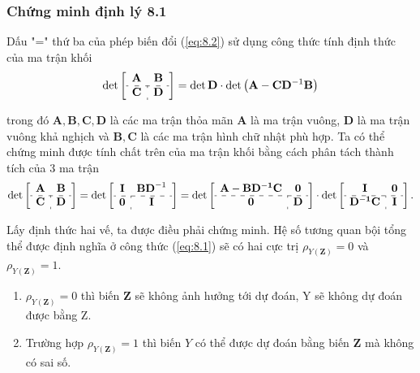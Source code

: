 
\begin{frame}
\frametitle{Chứng minh định lý 8.1}
Dấu "=" thứ ba của phép biến đổi (\ref{eq:8.2}) sử dụng công thức tính định thức của ma trận khối
\[
\det \left[
\begin{array}{c:c}
\mathbf{A} & \mathbf{B} \\
\hdashline
\mathbf{C} & \mathbf{D}
\end{array}
\right]
= \det \mathbf{D} \cdot \det \left( \mathbf{A} - \mathbf{C} \mathbf{D}^{-1} \mathbf{B} \right)
\]


trong đó $\mathbf{A},\mathbf{B},\mathbf{C},\mathbf{D}$ là các ma trận thỏa mãn $\mathbf{A}$ là ma trận vuông, $\mathbf{D}$ là ma trận vuông khả nghịch và $\mathbf{B},\mathbf{C}$ là các ma trận hình chữ nhật phù hợp.
Ta có thể chứng minh được tính chất trên của ma trận khối bằng cách phân tách thành tích của 3 ma trận
\[
\det \left[
\begin{array}{c:c}
\mathbf{A} & \mathbf{B} \\
\hdashline
\mathbf{C} & \mathbf{D}
\end{array}
\right]
=
\det \left[
\begin{array}{c:c}
\mathbf{I} & \mathbf{BD}^{-1} \\
\hdashline
\mathbf{0} & \mathbf{I}
\end{array}
\right]
=
\det \left[
\begin{array}{c:c}
\mathbf{A - BD^{-1}C} & \mathbf{0} \\
\hdashline
\mathbf{0} & \mathbf{D}
\end{array}
\right]
\cdot
\det \left[
\begin{array}{c:c}
\mathbf{I} & \mathbf{0} \\
\hdashline
\mathbf{D^{-1}C} & \mathbf{I}
\end{array}
\right].
\]

Lấy định thức hai vế, ta được điều phải chứng minh.
Hệ số tương quan bội tổng thể được định nghĩa ở công thức (\ref{eq:8.1}) sẽ có hai cực trị $\rho_{Y(\mathbf{Z})} = 0$ và $\rho_{Y(\mathbf{Z})} = 1$.
\begin{enumerate}
    \item$\rho_{Y(\mathbf{Z})}=0$ thì biến $\mathbf{Z}$ sẽ không ảnh hưởng tới dự đoán, Y sẽ không dự đoán được bằng Z.
    \item Trường hợp $\rho_{Y(\mathbf{Z})} = 1$ thì biến $Y$ có thể được dự đoán bằng biến \textbf{Z} mà không có sai số.
\end{enumerate}

\end{frame}

